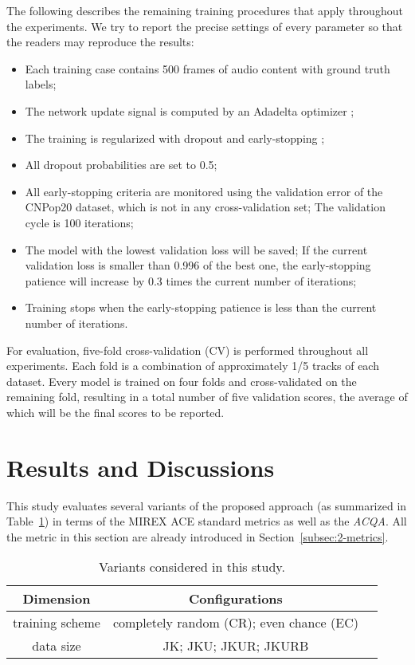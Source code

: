 The following describes the remaining training procedures that apply throughout the experiments. We try to report the precise settings of every parameter so that the readers may reproduce the results:
\begin{itemize}
	\item Each training case contains 500 frames of audio content with ground truth labels;
	\item The network update signal is computed by an Adadelta optimizer \cite{zeiler2012adadelta};
	\item The training is regularized with dropout \cite{srivastava2014dropout} and early-stopping \cite{prechelt1998early};
	\item All dropout probabilities are set to 0.5;
	\item All early-stopping criteria are monitored using the validation error of the CNPop20 dataset, which is not in any cross-validation set; The validation cycle is 100 iterations;
	\item The model with the lowest validation loss will be saved; If the current validation loss is smaller than 0.996 of the best one, the early-stopping patience will increase by 0.3 times the current number of iterations;
	\item Training stops when the early-stopping patience is less than the current number of iterations.
\end{itemize}
For evaluation, five-fold cross-validation (CV) is performed throughout all experiments. Each fold is a combination of approximately 1/5 tracks of each dataset. Every model is trained on four folds and cross-validated on the remaining fold, resulting in a total number of five validation scores, the average of which will be the final scores to be reported.

\section{Results and Discussions} \label{sec:4-res}
This study evaluates several variants of the proposed approach (as summarized in Table~\ref{tab:4-varexplore}) in terms of the MIREX ACE standard metrics as well as the \textit{ACQA}. All the metric in this section are already introduced in Section~\ref{subsec:2-metrics}.
\begin{table}[htb]
	\caption{Variants considered in this study.}
	\centering
	\scriptsize
	\begin{tabular}{|c|c|c|} \hline
		Dimension & Configurations \\ \hline
		training scheme & completely random (CR); even chance (EC) \\ \hline
		data size & JK; JKU; JKUR; JKURB \\ \hline
	\end{tabular}
	\label{tab:4-varexplore}
\end{table}


